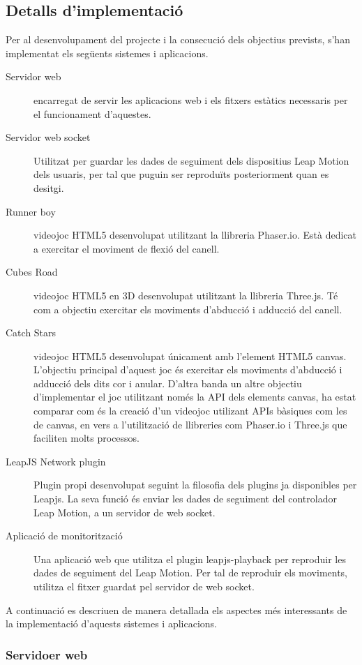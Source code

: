 \documentclass[12pt,a4paper,catalan]{article}
\begin{document}
	\subsection{Detalls d'implementació}
	Per al desenvolupament del projecte i la consecució dels objectius prevists, s'han implementat els següents sistemes i aplicacions.
	\begin{description}
		\item[Servidor web] encarregat de servir les aplicacions web i els fitxers estàtics necessaris per el funcionament d'aquestes.
		\item[Servidor web socket] Utilitzat per guardar les dades de seguiment dels dispositius Leap Motion dels usuaris, per tal que puguin ser reproduïts posteriorment quan es desitgi.
		\item[Runner boy] videojoc HTML5 desenvolupat utilitzant la llibreria Phaser.io. Està dedicat a exercitar el moviment de flexió del canell.
		\item[Cubes Road] videojoc HTML5 en 3D desenvolupat utilitzant la llibreria Three.js. Té com a objectiu exercitar els moviments d'abducció i adducció del canell.
		\item[Catch Stars] videojoc HTML5 desenvolupat únicament amb l'element HTML5 canvas. L'objectiu principal d'aquest joc és exercitar els moviments d'abducció i adducció dels dits cor i anular. D'altra banda un altre objectiu d'implementar el joc utilitzant només la API dels elements canvas, ha estat comparar com és la creació d'un videojoc utilizant APIs bàsiques com les de canvas, en vers a l'utilització de llibreries com Phaser.io i Three.js que faciliten molts processos.
		\item[LeapJS Network plugin] Plugin propi desenvolupat seguint la filosofia dels plugins ja disponibles per Leapjs. La seva funció és enviar les dades de seguiment del controlador Leap Motion, a un servidor de web socket.
		\item[Aplicació de monitorització] Una aplicació web que utilitza el plugin leapjs-playback per reproduir les dades de seguiment del Leap Motion. Per tal de reproduir els moviments, utilitza el fitxer guardat pel servidor de web socket.
	\end{description}
	A continuació es descriuen de manera detallada els aspectes més interessants de la implementació d'aquests sistemes i aplicacions.
	\subsubsection{Servidoer web}
\end{document}
